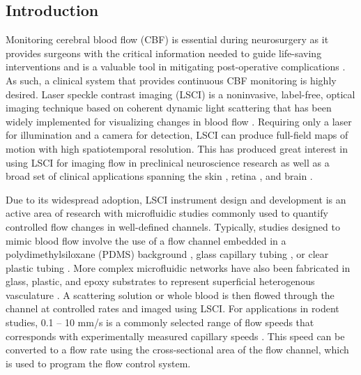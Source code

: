 \documentclass[12pt]{spieman}
\begin{document}
\begin{spacing}{2}


\section{Introduction}
\label{sect:introduction}

Monitoring cerebral blood flow (CBF) is essential during neurosurgery as it provides surgeons with the critical information needed to guide life-saving interventions and is a valuable tool in mitigating post-operative complications \cite{Kirkness.2005}. As such, a clinical system that provides continuous CBF monitoring is highly desired. Laser speckle contrast imaging (LSCI) is a noninvasive, label-free, optical imaging technique based on coherent dynamic light scattering that has been widely implemented for visualizing changes in blood flow \cite{Briers:2001hy,Boas:2010vr}. Requiring only a laser for illumination and a camera for detection, LSCI can produce full-field maps of motion with high spatiotemporal resolution. This has produced great interest in using LSCI for imaging flow in preclinical neuroscience research \cite{Dunn:2001dj,Ayata:2004ba,Bolay:2002jg,Durduran.2004} as well as a broad set of clinical applications spanning the skin \cite{Briers:1996kfa,Choi:2004jn}, retina \cite{Briers.1982,Srienc.2010}, and brain \cite{Hecht:2009gu,Parthasarathy:2010gh,Klijn:2012ls}.

Due to its widespread adoption, LSCI instrument design and development is an active area of research with microfluidic studies commonly used to quantify controlled flow changes in well-defined channels. Typically, studies designed to mimic blood flow involve the use of a flow channel embedded in a polydimethylsiloxane (PDMS) background \cite{Parthasarathy:2008el}, glass capillary tubing \cite{Choi:2004jn}, or clear plastic tubing \cite{Miao:2014}. More complex microfluidic networks have also been fabricated in glass, plastic, and epoxy substrates to represent superficial heterogenous vasculature \cite{Luu.2012}. A scattering solution \cite{Parthasarathy:2008el} or whole blood\cite{Choi:2004jn,Miao:2014} is then flowed through the channel at controlled rates and imaged using LSCI. For applications in rodent studies, 0.1 -- 10 mm/s is a commonly selected range of flow speeds that corresponds with experimentally measured capillary speeds \cite{Tomita:2008do}. This speed can be converted to a flow rate using the cross-sectional area of the flow channel, which is used to program the flow control system.


\end{spacing}
\end{document}
